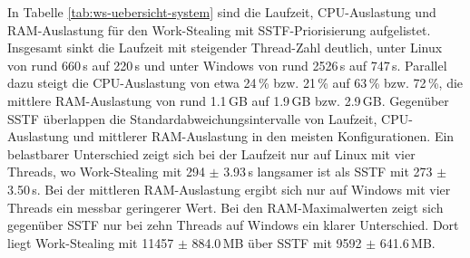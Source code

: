 \begin{sloppypar}
\begin{table}[H]
\caption{Laufzeit-, \acs{CPU}- und \acs{RAM}-Metriken des Work-Stealing-Schedulers mit \acs{SSTF}-Priorisierung für Linux und Windows bei einem, vier und zehn Threads, angegeben als Mittelwerte $\pm$ Standardabweichung aus $n=20$ Läufen}
\label{tab:ws-uebersicht-system}
\centering
\begingroup
\setlength{\tabcolsep}{4pt}
\endgroup
\end{table}

\noindent In Tabelle \ref{tab:ws-uebersicht-system} sind die Laufzeit, \acs{CPU}-Auslastung und \acs{RAM}-Auslastung für den Work-Stealing mit \acs{SSTF}-Priorisierung aufgelistet. Insgesamt sinkt die Laufzeit mit steigender Thread-Zahl deutlich, unter Linux von rund 660\,s auf 220\,s und unter Windows von rund 2526\,s auf 747\,s. Parallel dazu steigt die \acs{CPU}-Auslastung von etwa 24\,\% bzw. 21\,\% auf 63\,\% bzw. 72\,\%, die mittlere \acs{RAM}-Auslastung von rund 1.1\,GB auf 1.9\,GB bzw. 2.9\,GB. Gegenüber \acs{SSTF} überlappen die Standardabweichungsintervalle von Laufzeit, \acs{CPU}-Auslastung und mittlerer \acs{RAM}-Auslastung in den meisten Konfigurationen. Ein belastbarer Unterschied zeigt sich bei der Laufzeit nur auf Linux mit vier Threads, wo Work-Stealing mit 294 $\pm$ 3.93\,s langsamer ist als \acs{SSTF} mit 273 $\pm$ 3.50\,s. Bei der mittleren \acs{RAM}-Auslastung ergibt sich nur auf Windows mit vier Threads ein messbar geringerer Wert. Bei den \acs{RAM}-Maximalwerten zeigt sich gegenüber \acs{SSTF} nur bei zehn Threads auf Windows ein klarer Unterschied. Dort liegt Work-Stealing mit 11457 $\pm$ 884.0\,MB über \acs{SSTF} mit 9592 $\pm$ 641.6\,MB.


\end{sloppypar}
